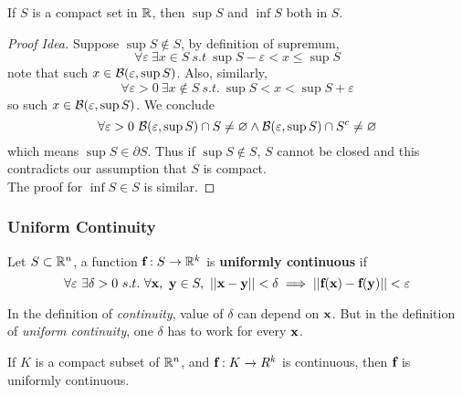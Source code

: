 \documentclass[11pt]{article}
\newcommand{\vex}[0]{\ve{x}}
\newcommand{\vey}[0]{\ve{y}}
\newcommand{\vef}[0]{\ve{f}}
\begin{document}
				\begin{proposition}
					If $S$ is a compact set in $\mathbb{R}$, then $\sup S$ and $\inf S$ both in $S$.
					\begin{proof}[Proof Idea]
						Suppose $\sup S \notin S$, by definition of supremum,
						\begin{equation}
							\forall \varepsilon\ \exists x \in S\ s.t\ \sup S - \varepsilon < x \leq \sup S
						\end{equation}
						note that such $x \in \mathcal{{B}}(\varepsilon, \sup S)$. Also, similarly,
						\begin{equation}
							\forall \varepsilon > 0\ \exists x \notin S\ s.t.\ \sup S < x < \sup S + \varepsilon
						\end{equation}
						so such $x \in \mathcal{{B}}(\varepsilon, \sup S)$. We conclude
						\begin{equation}
							\forall \varepsilon > 0\ \mathcal{{B}}(\varepsilon, \sup S) \cap S \neq \varnothing \land \mathcal{{B}}(\varepsilon, \sup S) \cap S^c \neq \varnothing
						\end{equation} 
						which means $\sup S \in \partial S$. Thus if $\sup S \notin S$, $S$ cannot be closed and this contradicts our assumption that $S$ is compact. \\
						The proof for $\inf S \in S$ is similar.
					\end{proof}
				\end{proposition}
				
			\subsubsection{Uniform Continuity}
				\begin{definition}
					Let $S \subset \mathbb{R}^n$, a function $\textbf{f}: S \to \mathbb{R}^k$ is \textbf{uniformly continuous} if 
					\begin{equation}
						\forall \varepsilon\ \exists \delta > 0\ s.t.\ \forall \vex,\ \vey \in S,\ \norm{\vex - \vey} < \delta \implies \norm{\vef(\vex) - \vef(\vey)} < \varepsilon
					\end{equation}
				\end{definition}
				
				\begin{remark}
					In the definition of \emph{continuity}, value of $\delta$ can depend on $\vex$. But in the definition of \emph{uniform continuity}, one $\delta$ has to work for every $\vex$. 
				\end{remark}
				
				\begin{theorem}
					If $K$ is a compact subset of $\mathbb{R}^n$, and $\vef: K \to R^k$ is continuous, then $\vef$ is uniformly continuous.
				\end{theorem}
				
\end{document}
